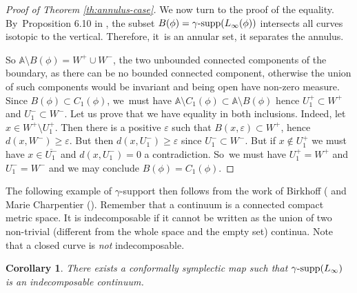 \documentclass[10pt]{amsart}
\newtheorem{cor}[thm]{Corollary}
\theoremstyle{definition}
\DeclareMathOperator{\gammasupp}{\gamma\textup{-supp}}
\begin{document}
\begin{proof}[Proof of Theorem \ref{th:annulus-case}]
We now turn to the proof of the equality. By~Proposition 6.10 in \cite{Viterbo-gammas}, the subset $B(\phi)=\gammasupp(L_{\infty}(\phi))$ intersects all curves isotopic to the vertical. Therefore, it~is an annular set, \ie it separates the annulus.

So $\mathbb A \setminus B(\phi) = W^{+}\cup W^{-}$, the two unbounded connected components of the boundary, as there can be no bounded connected component, otherwise the union of such components would be invariant and being open have non-zero measure. Since $B(\phi)\subset C_{1}(\phi)$, we~must have
$\mathbb A \setminus C_{1}(\phi) \subset \mathbb A \setminus B(\phi) $ hence $U_{1}^{+} \subset W^{+}$ and $U_{1}^{-} \subset W^{-}$. Let us prove that we have equality in both inclusions. Indeed, let $x\in W^{+} \setminus U_{1}^{+}$. Then there is a positive $ \varepsilon $ such that $B(x, \varepsilon)\subset W^{+}$, hence $d(x,W^{-}) \geq \varepsilon $. But then $d(x,U_{1}^{-}) \geq \varepsilon $ since $U_{1}^{-} \subset W^{-}$. But if $x\notin U_{1}^{+}$ we must have
$x\in \overline{U_{1}^{-}}$ and $d(x,U_{1}^{-})=0$ a contradiction. So~we must have $U_{1}^{+} = W^{+}$ and $U_{1}^{-} = W^{-}$ and we may conclude $B(\phi)=C_{1}(\phi)$.
\end{proof}

The following example of $\gamma$\nobreakdash-support then follows from the work of Birkhoff (\cite{Birkhoff-attractor} and Marie Charpentier (\cite{Charpentier-1}). Remember that a continuum is a connected compact metric space. It is indecomposable if it cannot be written as the union of two
non-trivial (\ie different from the whole space and the empty set) continua. Note that a closed curve is \emph{not} indecomposable.

\begin{cor} \label{Cor-C7}
There exists a conformally symplectic map such that $\gammasupp(L_{\infty})$ is an indecomposable continuum.
\end{cor}
\end{document}
